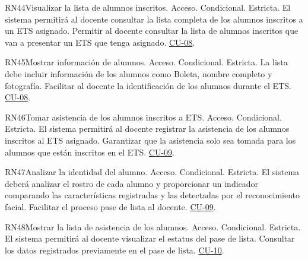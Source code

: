 \begin{BussinesRule}{RN44}{Visualizar la lista de alumnos inscritos.}
    \BRitem[Tipo:] Acceso.
    \BRitem[Clase:] Condicional.
    \BRitem[Nivel:] Estricta.
    \BRitem[Descripción:] El sistema permitirá al docente consultar la lista completa de los alumnos inscritos a un ETS asignado.
    \BRitem[Motivación:] Permitir al docente consultar la lista de alumnos inscritos que van a presentar un ETS que tenga asignado.
     \hyperlink{CU-08}{CU-08}.
    \end{BussinesRule}

\begin{BussinesRule}{RN45}{Mostrar información de alumnos.}
    \BRitem[Tipo:] Acceso.
    \BRitem[Clase:] Condicional.
    \BRitem[Nivel:] Estricta.
    \BRitem[Descripción:] La lista debe incluir información de los alumnos como Boleta, nombre completo y fotografía.
    \BRitem[Motivación:] Facilitar al docente la identificación de los alumnos durante el ETS.
     \hyperlink{CU-08}{CU-08}.
    \end{BussinesRule}

\begin{BussinesRule}{RN46}{Tomar asistencia de los alumnos inscritos a ETS.}
    \BRitem[Tipo:] Acceso.
    \BRitem[Clase:] Condicional.
    \BRitem[Nivel:] Estricta.
    \BRitem[Descripción:] El sistema permitirá al docente registrar la asistencia de los alumnos inscritos al ETS asignado.
    \BRitem[Motivación:] Garantizar que la asistencia solo sea tomada para los alumnos que están inscritos en el ETS.
     \hyperlink{CU-09}{CU-09}.
    \end{BussinesRule}

\begin{BussinesRule}{RN47}{Analizar la identidad del alumno.}
    \BRitem[Tipo:] Acceso.
    \BRitem[Clase:] Condicional.
    \BRitem[Nivel:] Estricta.
    \BRitem[Descripción:] El sistema deberá analizar el rostro de cada alumno y proporcionar un indicador comparando las características registradas y las detectadas por el reconocimiento facial.
    \BRitem[Motivación:] Facilitar el proceso pase de lista al docente. 
     \hyperlink{CU-09}{CU-09}.
    \end{BussinesRule}

\begin{BussinesRule}{RN48}{Mostrar la lista de asistencia de los alumnos.}
    \BRitem[Tipo:] Acceso.
    \BRitem[Clase:] Condicional.
    \BRitem[Nivel:] Estricta.
    \BRitem[Descripción:] El sistema permitirá al docente visualizar el estatus del pase de lista.
    \BRitem[Motivación:] Consultar los datos registrados previamente en el pase de lista.
     \hyperlink{CU-10}{CU-10}.
    \end{BussinesRule}

